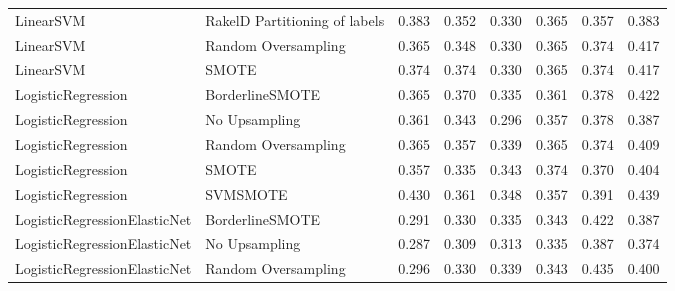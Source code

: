 \begin{tabular}{llllllll}
                      LinearSVM & RakelD Partitioning of labels & 0.383 &                     0.352 &                 0.330 &                  0.365 &                                   0.357 &     0.383 \\
                      LinearSVM &           Random Oversampling & 0.365 &                     0.348 &                 0.330 &                  0.365 &                                   0.374 &     0.417 \\
                      LinearSVM &                         SMOTE & 0.374 &                     0.374 &                 0.330 &                  0.365 &                                   0.374 &     0.417 \\
             LogisticRegression &               BorderlineSMOTE & 0.365 &                     0.370 &                 0.335 &                  0.361 &                                   0.378 &     0.422 \\
             LogisticRegression &                 No Upsampling & 0.361 &                     0.343 &                 0.296 &                  0.357 &                                   0.378 &     0.387 \\
             LogisticRegression &           Random Oversampling & 0.365 &                     0.357 &                 0.339 &                  0.365 &                                   0.374 &     0.409 \\
             LogisticRegression &                         SMOTE & 0.357 &                     0.335 &                 0.343 &                  0.374 &                                   0.370 &     0.404 \\
             LogisticRegression &                      SVMSMOTE & 0.430 &                     0.361 &                 0.348 &                  0.357 &                                   0.391 &     0.439 \\
   LogisticRegressionElasticNet &               BorderlineSMOTE & 0.291 &                     0.330 &                 0.335 &                  0.343 &                                   0.422 &     0.387 \\
   LogisticRegressionElasticNet &                 No Upsampling & 0.287 &                     0.309 &                 0.313 &                  0.335 &                                   0.387 &     0.374 \\
   LogisticRegressionElasticNet &           Random Oversampling & 0.296 &                     0.330 &                 0.339 &                  0.343 &                                   0.435 &     0.400 \\

\end{tabular}
